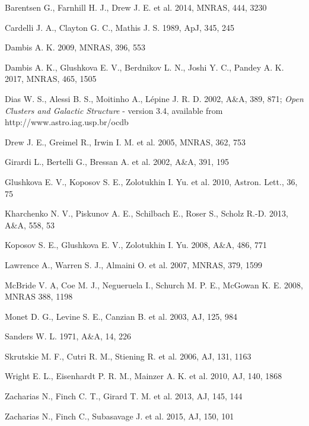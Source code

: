 {{{{{{{{{{{{{
 Barentsen G., Farnhill H. J., Drew J. E. et al. 2014, MNRAS, 444,
3230

 Cardelli J. A., Clayton G. C., Mathis J. S. 1989, ApJ, 345, 245

 Dambis A. K. 2009, MNRAS, 396, 553

 Dambis A. K., Glushkova E. V., Berdnikov L. N., Joshi Y. C., Pandey A. K.
        2017, MNRAS, 465, 1505

 Dias W. S., Alessi B. S., Moitinho A., L\'{e}pine J. R. D. 2002,
A\&A, 389, 871; {\it Open Clusters and Galactic Structure} - version
3.4, available from http://www.astro.iag.usp.br/ocdb

 Drew J. E., Greimel R., Irwin I. M. et al. 2005, MNRAS, 362, 753

 Girardi L., Bertelli G., Bressan A. et al. 2002, A\&A, 391, 195

 Glushkova E. V., Koposov S. E., Zolotukhin I. Yu. et al. 2010,
Astron.  Lett., 36, 75

 Kharchenko N. V., Piskunov A. E., Schilbach E., Roser S., Scholz
R.-D. 2013, A\&A, 558, 53

 Koposov S. E., Glushkova E. V., Zolotukhin I. Yu. 2008, A\&A, 486,
771

 Lawrence A., Warren S. J., Almaini O. et al. 2007, MNRAS, 379, 1599

 McBride V. A, Coe M. J., Negueruela I., Schurch M. P. E., McGowan
K. E. 2008, MNRAS 388, 1198

 Monet D. G., Levine S. E., Canzian B. et al. 2003, AJ, 125, 984

 Sanders W. L. 1971, A\&A, 14, 226

 Skrutskie M. F., Cutri R. M., Stiening R. et al. 2006, AJ, 131,
1163

 Wright E. L., Eisenhardt P. R. M., Mainzer A. K. et al. 2010, AJ,
140, 1868

 Zacharias N., Finch C. T., Girard T. M. et al. 2013, AJ, 145, 144

 Zacharias N., Finch C., Subasavage J. et al. 2015, AJ, 150, 101


}}}}}}}}}}}}}
